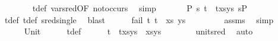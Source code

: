 \begin{isabellebody}
\ \ \ \ \ \ \isamarkupfalse%
\ t{}{\isacharunderscore}{\kern0pt}def\ var{\isacharunderscore}{\kern0pt}{}{\isacharunderscore}{\kern0pt}sred{\isacharbrackleft}{\kern0pt}OF\ not{\isacharunderscore}{\kern0pt}occurs{\isacharbrackright}{\kern0pt}\ \isamarkupfalse%
\ simp\isanewline
\ \ \ \ \isamarkupfalse%
\ {\isachardoublequoteopen}{\isasymexists}\ P{}\ s{\isachardot}{\kern0pt}\ {\isacharparenleft}{\kern0pt}{\isacharparenleft}{\kern0pt}t{}\ {\isasymapprox}{\isacharquery}{\kern0pt}\ t{}{\isacharparenright}{\kern0pt}{\isacharhash}{\kern0pt}xs{\isacharcomma}{\kern0pt}ys{\isacharparenright}{\kern0pt}\ {\isasymTurnstile}{\isacharparenleft}{\kern0pt}{\isacharbraceleft}{\kern0pt}{\isacharbraceright}{\kern0pt}{\isacharcomma}{\kern0pt}s{\isacharparenright}{\kern0pt}{\isasymRightarrow}P{}{\isachardoublequoteclose}\isanewline
\ \ \ \ \ \ \isamarkupfalse%
\ t{}{\isacharunderscore}{\kern0pt}def\ t{}{\isacharunderscore}{\kern0pt}def\ sred{\isacharunderscore}{\kern0pt}single\ \isamarkupfalse%
\ blast\isanewline
\ \ \ \ \isamarkupfalse%
\ {\isachardoublequoteopen}fail\ {\isacharparenleft}{\kern0pt}{\isacharparenleft}{\kern0pt}t{}{\isacharcomma}{\kern0pt}\ t{}{\isacharparenright}{\kern0pt}\ {\isacharhash}{\kern0pt}\ xs{\isacharcomma}{\kern0pt}\ ys{\isacharparenright}{\kern0pt}{\isachardoublequoteclose}\ \isanewline
\ \ \ \ \ \ \isamarkupfalse%
\ assms\ \isamarkupfalse%
\ simp\isanewline
\ \ \isamarkupfalse%
\isanewline
\ \ \ \ \isamarkupfalse%
\ Unit\isanewline
\ \ \ \ \isamarkupfalse%
\ t{}{\isacharunderscore}{\kern0pt}def\isanewline
\ \ \ \ \isamarkupfalse%
\ {\isachardoublequoteopen}{\isacharparenleft}{\kern0pt}{\isacharparenleft}{\kern0pt}t{}\ {\isasymapprox}{\isacharquery}{\kern0pt}\ t{}{\isacharparenright}{\kern0pt}{\isacharhash}{\kern0pt}xs{\isacharcomma}{\kern0pt}ys{\isacharparenright}{\kern0pt}\ {\isasymturnstile}{\isacharbrackleft}{\kern0pt}{\isacharbrackright}{\kern0pt}{\isasymleadsto}\ {\isacharparenleft}{\kern0pt}xs{\isacharcomma}{\kern0pt}ys{\isacharparenright}{\kern0pt}{\isachardoublequoteclose}\isanewline
\ \ \ \ \ \ \isamarkupfalse%
\ unit{\isacharunderscore}{\kern0pt}sred\ \isamarkupfalse%
\ auto\isanewline
\ \ \ \ \isamarkupfalse%

\end{isabellebody}
